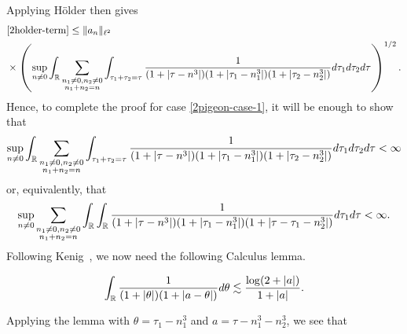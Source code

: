 %
Applying H{\"o}lder then gives
%
%
\begin{equation*}
	\begin{split}
		& \eqref{2holder-term}
		 \le \| a_{n} \|_{\ell^2}
		\\
		& \times \left( \sup_{n \neq 0} \int_{\mathbb{R}}
		\sum_{\substack{n_1 \neq 0, n_2 \neq 0 \\n_1 +n_2 =n}} \int_{\tau_1 + \tau_2
		= \tau} \frac{1}{(1 + | \tau - n^{3} |)(1 + |
		\tau_{1}-n_{1}^{3} |)(1 + | \tau_2 -n_{2}^{3} |)} d \tau_1 d \tau_2 d \tau
		\right)^{1/2}.
	\end{split}
\end{equation*}
%
%
Hence, to complete the proof for case \eqref{2pigeon-case-1}, it will be enough
to show that 
%
%
%
%
\begin{equation*}
	\begin{split}
		 \sup_{n \neq 0} \int_{\mathbb{R}}
		\sum_{\substack{n_1 \neq 0, n_2 \neq 0 \\n_1 +n_2 =n}} \int_{\tau_1 + \tau_2
		= \tau} \frac{1}{(1 + | \tau - n^{3} |)(1 + |
		\tau_{1}-n_{1}^{3} |)(1 + | \tau_2 -n_{2}^{3} |)} d \tau_1 d \tau_2 d \tau <\infty
	\end{split}
\end{equation*}
%
%
or, equivalently, that
%
%
\begin{equation}
	\label{212g}
	\begin{split}
		\sup_{n \neq 0} \sum_{\substack{n_1 \neq 0, n_2 \neq 0 \\n_1 +n_2 =n}} \int_{\mathbb{R}}
		\int_{\mathbb{R}}  \frac{1}{(1 + | \tau - n^{3} |)(1 + | \tau_1 - n_{1}^{3} |)(1 + | \tau - \tau_1 -
		n_2^3 |)} d \tau_1 d \tau < \infty.
	\end{split}
\end{equation}
%
%
Following Kenig~\cite{Kenig:1996yn}, we now need the following Calculus lemma.
%
%
%
%
%
%
%
%
\begin{lemma}
	\label{2lem:calc}
 \begin{equation}
	 \label{2calc}
	 \begin{split}
		 \int_{\mathbb{R}} \frac{1}{(1 + | \theta |)(1 + | a - \theta |)} d \theta \lesssim
		 \frac{\log(2 + | a |)}{1 + | a |}.
	 \end{split}
 \end{equation}
 \end{lemma}
%
%
Applying the lemma with $\theta = \tau_1 - n_1^3$ and $a = \tau - n_1^3 -
n_2^3$, we see that
